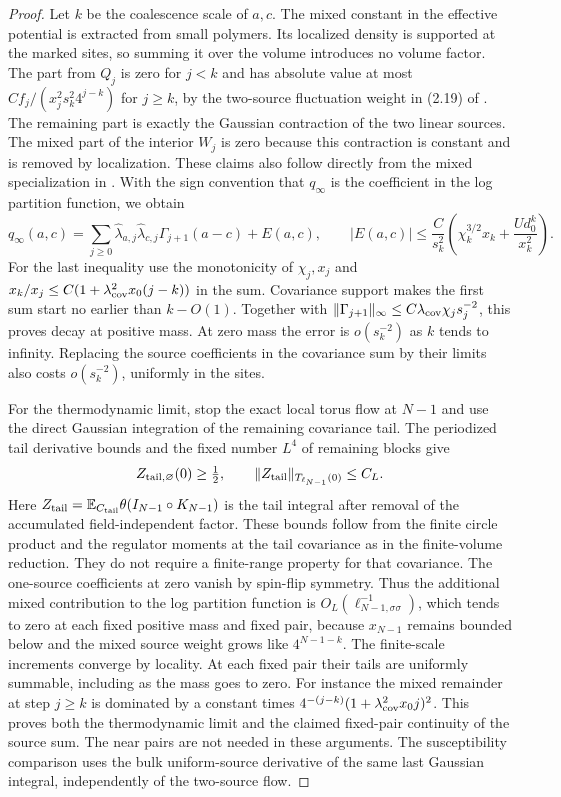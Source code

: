 \documentclass[11pt]{article}
\begin{document}
\begin{proof}
Let \(k\) be the coalescence scale of \(a,c\). The mixed constant
in the effective potential is extracted from small polymers. Its
localized density is supported at the marked sites, so summing it
over the volume introduces no volume factor.
The part from \(Q_j\) is zero for \(j<k\) and has absolute
value at most \(Cf_j/(x_j^2s_k^2 4^{j-k})\) for
\(j\ge k\), by the two-source fluctuation weight in (2.19) of
\cite{ParkMap}. The remaining part is exactly the Gaussian
contraction of the two linear sources. The mixed part of the
interior \(W_j\) is zero because this contraction is constant
and is removed by localization. These claims also follow
directly from the mixed specialization in \cite[Lemma~8.4]{ParkTorus}.
With the sign convention that \(q_\infty\) is the coefficient
in the log partition function, we obtain
\[
 q_\infty(a,c)=\sum_{j\ge0}\widehat\lambda_{a,j}
            \widehat\lambda_{c,j}\Gamma_{j+1}(a-c)+E(a,c),
 \qquad
 |E(a,c)|\le \frac{C}{s_k^2}
 \left(\chi_k^{3/2}x_k+\frac{Ud_0^k}{x_k^2}\right).
\]
For the last inequality use the monotonicity of \(\chi_j,x_j\)
and \(x_k/x_j\le C(1+\lambda_{\rm cov}^2x_0(j-k))\) in the sum. Covariance
support makes the first sum start no earlier than \(k-O(1)\).
Together with \(\|\Gamma_{j+1}\|_\infty\le C\lambda_{\rm cov}\chi_j s_j^{-2}\),
this proves decay at positive mass. At zero mass the error is
\(o(s_k^{-2})\) as \(k\) tends to infinity. Replacing the source
coefficients in the covariance sum by their limits also costs
\(o(s_k^{-2})\), uniformly in the sites.

For the thermodynamic limit, stop the exact local torus flow
at \(N-1\) and use the direct Gaussian integration of the
remaining covariance tail. The periodized tail derivative
bounds and the fixed number \(L^4\) of remaining blocks give
\[
 Z_{\rm tail,\varnothing}(0)\ge\tfrac12,\qquad
 \|Z_{\rm tail}\|_{T_{\ell_{N-1}}(0)}\le C_L .
\]
Here \(Z_{\rm tail}=\mathbb E_{C_{\rm tail}}\theta
(I_{N-1}\circ K_{N-1})\) is the tail integral after removal of
the accumulated field-independent factor. These bounds follow
from the finite circle product and the regulator moments at
the tail covariance as in the finite-volume reduction. They
do not require a finite-range property for that covariance.
The one-source coefficients at zero vanish by spin-flip
symmetry. Thus the additional mixed contribution to the
log partition function is \(O_L(\ell_{N-1,\sigma\sigma}^{-1})\),
which tends to zero at each fixed positive mass and fixed
pair, because \(x_{N-1}\) remains bounded below and the
mixed source weight grows like \(4^{N-1-k}\).
The finite-scale increments converge by locality. At each
fixed pair their tails are uniformly summable, including
as the mass goes to zero. For instance the mixed remainder
at step \(j\ge k\) is dominated by a constant times
\(4^{-(j-k)}(1+\lambda_{\rm cov}^2x_0j)^2\). This proves
both the thermodynamic limit and the claimed fixed-pair
continuity of the source sum. The near pairs are not needed
in these arguments. The susceptibility comparison uses the
bulk uniform-source derivative of the same last Gaussian
integral, independently of the two-source flow.


\end{proof}
\end{document}
